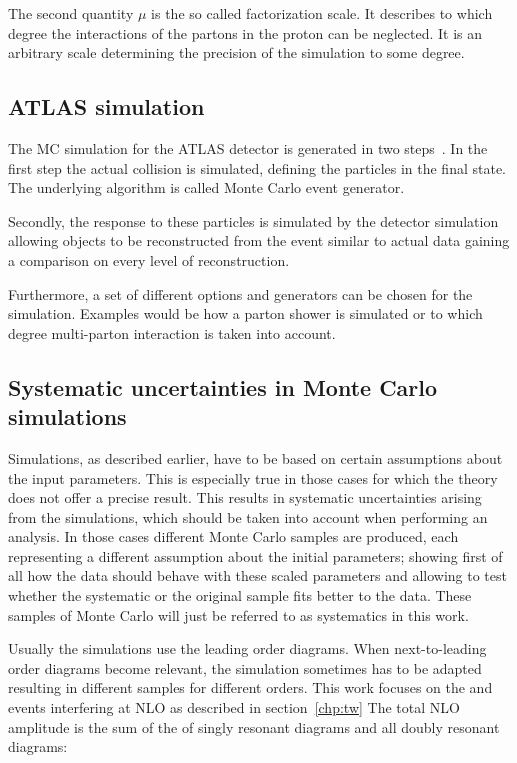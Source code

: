 The second quantity $\mu$ is the so called factorization scale. It describes to which degree the interactions of the partons in the proton can be neglected. It is an arbitrary scale determining the precision of the simulation to some degree.

\subsection{ATLAS simulation}

The MC simulation for the ATLAS detector is generated in two steps~\cite{atlasmontecarlo}.
In the first step the actual collision is simulated, defining the particles in the final state. The underlying algorithm is called Monte Carlo event generator.

Secondly, the response to these particles is simulated by the detector simulation allowing objects to be reconstructed from the event similar to actual data gaining a comparison on every level of reconstruction.

Furthermore, a set of different options and generators can be chosen for the simulation. Examples would be how a parton shower is simulated or to which degree multi-parton interaction is taken into account.

\subsection{Systematic uncertainties in Monte Carlo simulations}
\label{sec:systmc}

Simulations, as described earlier, have to be based on certain assumptions about the input parameters. This is especially true in those cases for which the theory does not offer a precise result. This results in systematic uncertainties arising from the simulations, which should be taken into account when performing an analysis.
In those cases different Monte Carlo samples are produced, each representing a different assumption about the initial parameters; showing first of all how the data should behave with these scaled parameters and allowing to test whether the systematic or the original sample fits better to the data. 
These samples of Monte Carlo will just be referred to as systematics in this work.

Usually the simulations use the leading order diagrams.
When next-to-leading order diagrams become relevant, the simulation sometimes has to be adapted resulting in different samples for different orders.
This work focuses on the \tW and \ttbar events interfering at NLO as described in section~\ref{chp:tw}
The total NLO amplitude is the sum of the of singly resonant diagrams and all doubly resonant diagrams:

